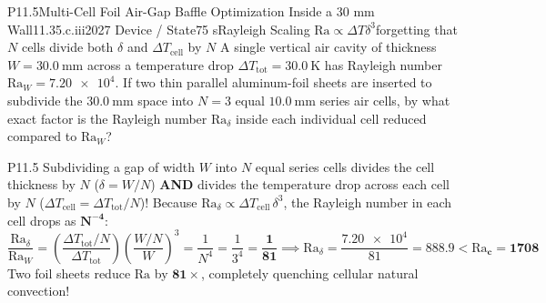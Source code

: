 \begin{problem}{P11.5}{Multi-Cell Foil Air-Gap Baffle Optimization Inside a 30 mm Wall}{11.3}{5.c.iii}{2027 Device / State}{75 s}{Rayleigh Scaling $\mathrm{Ra} \propto \Delta T \delta^3$}{forgetting that $N$ cells divide both $\delta$ and $\Delta T_{\mathrm{cell}}$ by $N$}
A single vertical air cavity of thickness $W = \SI{30.0}{\milli\meter}$ across a temperature drop $\Delta T_{\mathrm{tot}} = \SI{30.0}{\kelvin}$ has Rayleigh number $\mathrm{Ra}_W = \num{7.20e4}$. If two thin parallel aluminum-foil sheets are inserted to subdivide the $\SI{30.0}{\milli\meter}$ space into $N = 3$ equal $\SI{10.0}{\milli\meter}$ series air cells, by what exact factor is the Rayleigh number $\mathrm{Ra}_\delta$ inside each individual cell reduced compared to $\mathrm{Ra}_W$?
\end{problem}
\begin{solution}{P11.5}
Subdividing a gap of width $W$ into $N$ equal series cells divides the cell thickness by $N$ ($\delta = W/N$) \textbf{AND} divides the temperature drop across each cell by $N$ ($\Delta T_{\mathrm{cell}} = \Delta T_{\mathrm{tot}}/N$)! Because $\mathrm{Ra}_\delta \propto \Delta T_{\mathrm{cell}}\,\delta^3$, the Rayleigh number in each cell drops as $\mathbf{N^{-4}}$:
\[
  \frac{\mathrm{Ra}_\delta}{\mathrm{Ra}_W} = \left(\frac{\Delta T_{\mathrm{tot}}/N}{\Delta T_{\mathrm{tot}}}\right)\!\left(\frac{W/N}{W}\right)^{\!3} = \frac{1}{N^4} = \frac{1}{3^4} = \mathbf{\frac{1}{81}} \implies \mathrm{Ra}_\delta = \frac{\num{7.20e4}}{81} = \mathbf{888.9 < \mathrm{Ra}_c = 1708}
\]
Two foil sheets reduce $\mathrm{Ra}$ by $\mathbf{81\times}$, completely quenching cellular natural convection!
\end{solution}

